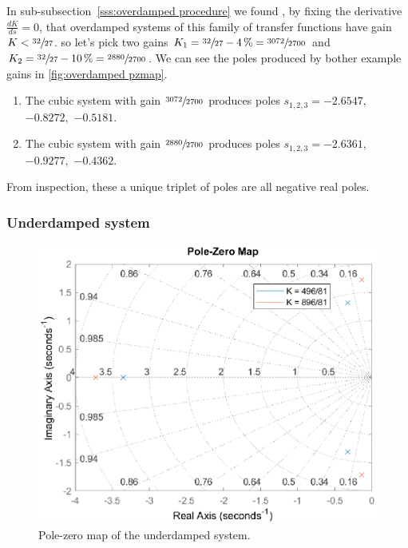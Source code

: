 \documentclass[12pt]{article}
\begin{document}
In sub-subsection~\ref{sss:overdamped procedure} we found%
, by fixing the derivative $\frac{dK}{ds} = 0$,
that overdamped systems of this family of transfer functions have gain $K < \sfrac{32}{27}$.
so let's pick two gains $K_1 = \sfrac{32}{27} - \SI4\percent = \sfrac{3072}{2700}$ and $K_2 = \sfrac{32}{27} - \SI{10}\percent = \sfrac{2880}{2700}$.
We can see the poles produced by bother example gains in \ref{fig:overdamped pzmap}.

\begin{enumerate}
    \item 
        The cubic system with gain $\sfrac{3072}{2700}$ produces poles $s_{1,2,3} = -2.6547,$ $-0.8272,$ $-0.5181$.
    \item
        The cubic system with gain $\sfrac{2880}{2700}$ produces poles $s_{1,2,3} = -2.6361,$ $-0.9277,$ $-0.4362$.
\end{enumerate}

From inspection, these a unique triplet of poles are all negative real poles.

\subsubsection{Underdamped system}

\begin{figure}
    \centering
    \includegraphics[width=\linewidth]{img/task02_02_underdamped_pzmap.eps}
    \caption{Pole-zero map of the underdamped system.}
    \label{fig:underdamped pzmap}
\end{figure}
\end{document}
